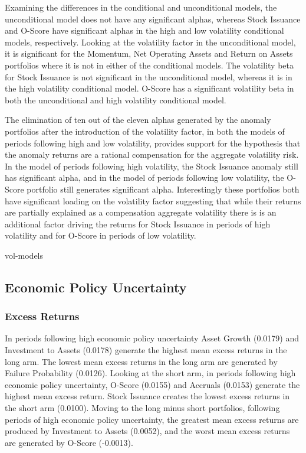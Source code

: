 \documentclass[12pt, a4paper, oneside]{article}
\begin{document}
Examining the differences in the conditional and unconditional models, the unconditional model does not have any significant alphas, whereas Stock Issuance and O-Score have significant alphas in the high and low volatility conditional models, respectively. Looking at the volatility factor in the unconditional model, it is significant for the Momentum, Net Operating Assets and Return on Assets portfolios where it is not in either of the conditional models. The volatility beta for Stock Issuance is not significant in the unconditional model, whereas it is in the high volatility conditional model. O-Score has a significant volatility beta in both the unconditional and high volatility conditional model.

The elimination of ten out of the eleven alphas generated by the anomaly portfolios after the introduction of the volatility factor, in both the models of periods following high and low volatility, provides support for the hypothesis that the anomaly returns are a rational compensation for the aggregate volatility risk. In the model of periods following high volatility, the Stock Issuance anomaly still has significant alpha, and in the model of periods following low volatility, the O-Score portfolio still generates significant alpha. Interestingly these portfolios both have significant loading on the volatility factor suggesting that while their returns are partially explained as a compensation aggregate volatility there is is an additional factor driving the returns for Stock Issuance in periods of high volatility and for O-Score in periods of low volatility.

{vol-models}

\subsection{Economic Policy Uncertainty}
\subsubsection{Excess Returns}
In periods following high economic policy uncertainty Asset Growth (0.0179) and Investment to Assets (0.0178) generate the highest mean excess returns in the long arm. The lowest mean excess returns in the long arm are generated by Failure Probability (0.0126). Looking at the short arm, in periods following high economic policy uncertainty, O-Score (0.0155) and Accruals (0.0153) generate the highest mean excess return. Stock Issuance creates the lowest excess returns in the short arm (0.0100). Moving to the long minus short portfolios, following periods of high economic policy uncertainty, the greatest mean excess returns are produced by Investment to Assets (0.0052), and the worst mean excess returns are generated by O-Score (-0.0013).
\end{document}
